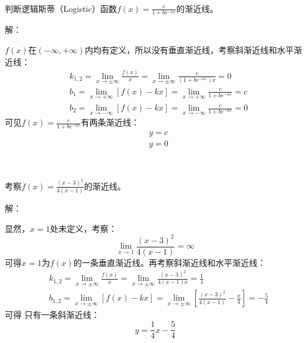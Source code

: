 ~

\begin{example}
判断逻辑斯蒂（Logistic）函数$f\left( x \right) =\frac{c}{1+be^{-ax}}$的渐近线。
\end{example}

解：

$f\left( x \right) $在$\left( -\infty ,+\infty \right) $内均有定义，所以没有垂直渐近线，考察斜渐近线和水平渐近线：
\begin{align*}
&k_{1,2}=\underset{x\rightarrow \pm \infty}{\lim}\frac{f\left( x \right)}{x}=\underset{x\rightarrow \pm \infty}{\lim}\frac{c}{\left( 1+be^{-ax} \right) x}=0 \\
&b_1=\underset{x\rightarrow +\infty}{\lim}\left[ f\left( x \right) -kx \right] =\underset{x\rightarrow +\infty}{\lim}\frac{c}{1+be^{-ax}}=c \\
&b_2=\underset{x\rightarrow -\infty}{\lim}\left[ f\left( x \right) -kx \right] =\underset{x\rightarrow -\infty}{\lim}\frac{c}{1+be^{-ax}}=0
\end{align*}
可见$f\left( x \right) =\frac{c}{1+be^{-ax}}$有两条渐近线：
\begin{align*}
&y=c \\
&y=0
\end{align*}

~

\begin{example}
考察$f\left( x \right) =\frac{\left( x-3 \right) ^2}{4\left( x-1 \right)}$的渐近线。
\end{example}

解：

显然，$x=1$处未定义，考察：
\[
\underset{x\rightarrow 1}{\lim}\frac{\left( x-3 \right) ^2}{4\left( x-1 \right)}=\infty
\]
可得$x=1$为$f\left( x \right) $的一条垂直渐近线。再考察斜渐近线和水平渐近线：
\begin{align*}
&k_{1,2}=\underset{x\rightarrow \pm \infty}{\lim}\frac{f\left( x \right)}{x}=\underset{x\rightarrow \pm \infty}{\lim}\frac{\left( x-3 \right) ^2}{4\left( x-1 \right) x}=\frac{1}{4} \\
&b_{1,2}=\underset{x\rightarrow \pm \infty}{\lim}\left[ f\left( x \right) -kx \right] =\underset{x\rightarrow \pm \infty}{\lim}\left[ \frac{\left( x-3 \right) ^2}{4\left( x-1 \right)}-\frac{x}{4} \right] =-\frac{5}{4}
\end{align*}
可得 只有一条斜渐近线：
\[
y=\frac{1}{4}x-\frac{5}{4}
\]




